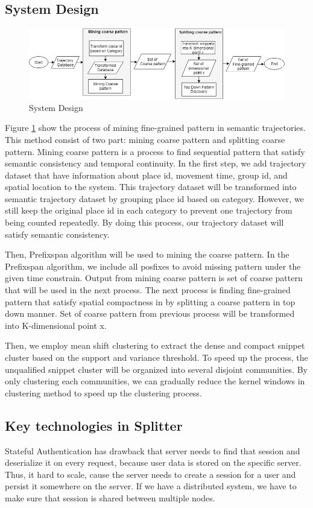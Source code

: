 \documentclass[conference]{IEEEtran}
\begin{document}
\subsection{System Design}
\begin{figure}[!ht]
\centering
\includegraphics[width=1\linewidth]{splitter}
\caption{System Design}
\label{fig:systemdesign}
\end{figure}
Figure \ref{fig:systemdesign} show the process of mining fine-grained pattern in semantic trajectories. This method consist of two part: mining coarse pattern and splitting coarse pattern. Mining coarse pattern is a process to find sequential pattern that satisfy semantic consistency and temporal continuity. In the first step, we add trajectory dataset that have information about place id, movement time, group id, and spatial location to the system. This trajectory dataset will be transformed into semantic trajectory dataset by grouping place id based on category. However, we still keep the original place id in each category to prevent one trajectory from being counted repeatedly. By doing this process, our trajectory dataset will satisfy semantic consistency.
\par
Then, Prefixspan algorithm will be used to mining the coarse pattern. In the Prefixspan algorithm, we include all posfixes to avoid missing pattern under the given time constrain. Output from mining coarse pattern is set of coarse pattern that will be used in the next process. The next process is finding fine-grained pattern that satisfy spatial compactness in by splitting a coarse pattern in top down manner. Set of coarse pattern from previous process will be transformed into K-dimensional point x.
\par
Then, we employ mean shift clustering to extract the dense and compact snippet cluster based on the support and variance threshold. To speed up the process, the unqualified snippet cluster will be organized into several disjoint communities. By only clustering each communities, we can gradually reduce the kernel windows in clustering method to speed up the clustering process.

\subsection{Key technologies in Splitter}
Stateful Authentication has drawback that server needs to find that session and deserialize it on every request, because user data is stored on the specific server. Thus, it hard to scale, cause the server needs to create a session for a user and persist it somewhere on the server. If we have a distributed system, we have to make sure that session is shared between multiple nodes.
\end{document}
